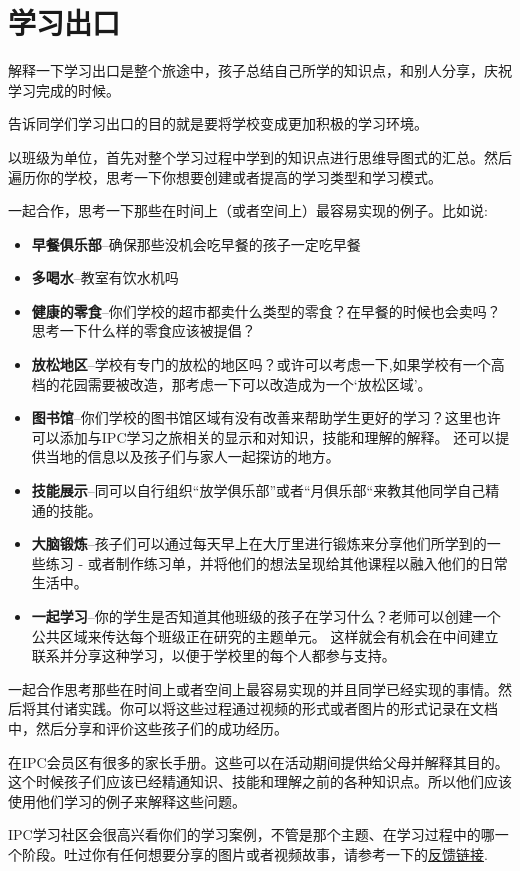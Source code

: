 \chapter{学习出口}
   解释一下学习出口是整个旅途中，孩子总结自己所学的知识点，和别人分享，庆祝学习完成的时候。\par
   告诉同学们学习出口的目的就是要将学校变成更加积极的学习环境。\par
   以班级为单位，首先对整个学习过程中学到的知识点进行思维导图式的汇总。然后遍历你的学校，思考一下你想要创建或者提高的学习类型和学习模式。\par
   一起合作，思考一下那些在时间上（或者空间上）最容易实现的例子。比如说:\par

   \begin{itemize}
     \item \textbf{早餐俱乐部}--确保那些没机会吃早餐的孩子一定吃早餐
     \item \textbf{多喝水}--教室有饮水机吗 
     \item \textbf{健康的零食}--你们学校的超市都卖什么类型的零食？在早餐的时候也会卖吗？思考一下什么样的零食应该被提倡？ 
     \item  \textbf{放松地区}--学校有专门的放松的地区吗？或许可以考虑一下,如果学校有一个高档的花园需要被改造，那考虑一下可以改造成为一个‘放松区域’。
     \item  \textbf{图书馆}--你们学校的图书馆区域有没有改善来帮助学生更好的学习？这里也许可以添加与IPC学习之旅相关的显示和对知识，技能和理解的解释。 还可以提供当地的信息以及孩子们与家人一起探访的地方。
      \item  \textbf{技能展示}--同可以自行组织“放学俱乐部”或者“月俱乐部“来教其他同学自己精通的技能。
      \item \textbf{大脑锻炼}--孩子们可以通过每天早上在大厅里进行锻炼来分享他们所学到的一些练习 - 或者制作练习单，并将他们的想法呈现给其他课程以融入他们的日常生活中。
      \item  \textbf{一起学习}--你的学生是否知道其他班级的孩子在学习什么？老师可以创建一个公共区域来传达每个班级正在研究的主题单元。 这样就会有机会在中间建立联系并分享这种学习，以便于学校里的每个人都参与支持。
    \end{itemize} 
   
   一起合作思考那些在时间上或者空间上最容易实现的并且同学已经实现的事情。然后将其付诸实践。你可以将这些过程通过视频的形式或者图片的形式记录在文档中，然后分享和评价这些孩子们的成功经历。\par
   \begin{note}
     在IPC会员区有很多的家长手册。这些可以在活动期间提供给父母并解释其目的。这个时候孩子们应该已经精通知识、技能和理解之前的各种知识点。所以他们应该使用他们学习的例子来解释这些问题。
    \end{note} 
   IPC学习社区会很高兴看你们的学习案例，不管是那个主题、在学习过程中的哪一个阶段。吐过你有任何想要分享的图片或者视频故事，请参考一下的\href{http://www.facebook.com/InternationalPrimaryCurriculum}{反馈链接}.
   
